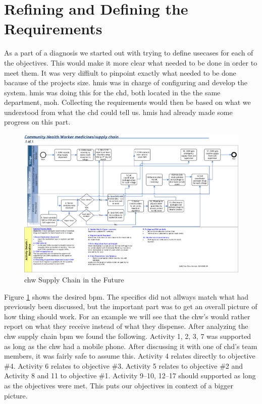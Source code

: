 \section{Refining and Defining the Requirements}
As a part of a diagnosis we started out with trying to define usecases for each of the objectives. 
This would make it more clear what needed to be done in order to meet them.
It was very diffiult to pinpoint exactly what needed to be done bacause of the projects size. 
\gls{hmis} was in charge of configuring and develop the system. \gls{hmis} was doing this for the \gls{chd}, both located in the the same department, \gls{moh}. 
Collecting the requirements would then be based on what we understood from what the \gls{chd} could tell us. \gls{hmis} had already made some progress on this part.  

\begin{figure}
\centering
\includegraphics[width=\textwidth]{case/img/chwSupplyChainFuture}
\caption{\gls{chw} Supply Chain in the Future}
\label{fig:chwSupplyChainFuture}
\end{figure}

Figure \ref{fig:chwSupplyChainFuture} shows the desired \gls{bpm}. The specifics did not allways match what had previously been discussed, but the important part was to get an overall picture of how thing should work. For an example we will see that the \gls{chw}'s would rather report on what they receive instead of what they dispense. After analyzing the \gls{chw} supply chain \gls{bpm} we found the following. 
Activity 1, 2, 3, 7 was supported as long as the \gls{chw} had a mobile phone. After discussing it with one of \gls{chd}'s team members, it was fairly safe to assume this. 
Activity 4 relates directly to objective \#4.
Activity 6 relates to objective \#3. 
Activity 5 relates to objective \#2 and Activity 8 and 11 to objective \#1. Activity 9--10, 12--17 should supported as long as the objectives were met. 
This puts our objectives in context of a bigger picture.

